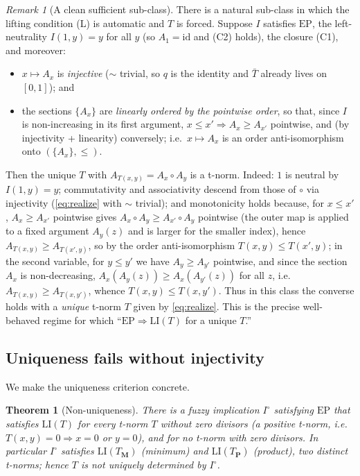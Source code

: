 \documentclass{amsart}
\newtheorem{theorem}{Theorem}
\theoremstyle{definition}
\theoremstyle{remark}
\newtheorem{remark}{Remark}
\newcommand{\zo}{[0,1]}
\newcommand{\LI}{\mathrm{LI}}
\newcommand{\EP}{\mathrm{EP}}
\newcommand{\Ax}{A}
\begin{document}
\begin{remark}[A clean sufficient sub-class]\label{rem:subclass}
There is a natural sub-class in which the lifting condition (L) is automatic and $T$ is
forced. Suppose $I$ satisfies $\EP$, the left-neutrality $I(1,y)=y$ for all $y$ (so $\Ax_1
=\mathrm{id}$ and (C2) holds), the closure (C1), and moreover:
\begin{itemize}
\item $x\mapsto\Ax_x$ is \emph{injective} ($\sim$ trivial, so $q$ is the identity and
$\bar T$ already lives on $\zo$); and
\item the sections $\{\Ax_x\}$ are \emph{linearly ordered by the pointwise order}, so that,
since $I$ is non-increasing in its first argument, $x\le x'\Rightarrow\Ax_x\ge\Ax_{x'}$
pointwise, and (by injectivity + linearity) conversely; i.e.\ $x\mapsto\Ax_x$ is an order
anti-isomorphism onto $(\{\Ax_x\},\le)$.
\end{itemize}
Then the unique $T$ with $\Ax_{T(x,y)}=\Ax_x\circ\Ax_y$ is a t-norm. Indeed: $1$ is neutral
by $I(1,y)=y$; commutativity and associativity descend from those of $\circ$ via injectivity
(\eqref{eq:realize} with $\sim$ trivial); and monotonicity holds because, for $x\le x'$,
$\Ax_x\ge\Ax_{x'}$ pointwise gives $\Ax_x\circ\Ax_y\ge\Ax_{x'}\circ\Ax_y$ pointwise (the
outer map is applied to a fixed argument $\Ax_y(z)$ and is larger for the smaller index),
hence $\Ax_{T(x,y)}\ge\Ax_{T(x',y)}$, so by the order anti-isomorphism $T(x,y)\le T(x',y)$;
in the second variable, for $y\le y'$ we have $\Ax_y\ge\Ax_{y'}$ pointwise, and since the
section $\Ax_x$ is non-decreasing, $\Ax_x(\Ax_y(z))\ge\Ax_x(\Ax_{y'}(z))$ for all $z$, i.e.\
$\Ax_{T(x,y)}\ge\Ax_{T(x,y')}$, whence $T(x,y)\le T(x,y')$. Thus in this class the converse holds with a
\emph{unique} t-norm $T$ given by \eqref{eq:realize}. This is the precise well-behaved regime
for which ``$\EP\Rightarrow\LI(T)$ for a unique $T$.''
\end{remark}

\subsection{Uniqueness fails without injectivity}

We make the uniqueness criterion concrete.

\begin{theorem}[Non-uniqueness]\label{thm:nonunique}
There is a fuzzy implication $I^{\circ}$ satisfying $\EP$ that satisfies $\LI(T)$ for
\emph{every} t-norm $T$ without zero divisors (a \emph{positive} t-norm, i.e.
$T(x,y)=0\Rightarrow x=0$ or $y=0$), and for no t-norm with zero divisors. In particular
$I^{\circ}$ satisfies $\LI(T_{\mathbf M})$ (minimum) and $\LI(T_{\mathbf P})$ (product),
two distinct t-norms; hence $T$ is not uniquely determined by $I^{\circ}$.
\end{theorem}
\end{document}
